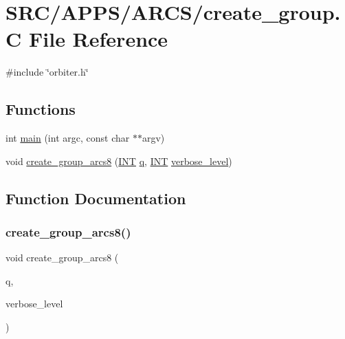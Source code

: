 \hypertarget{create__group_8_c}{}\section{S\+R\+C/\+A\+P\+P\+S/\+A\+R\+C\+S/create\+\_\+group.C File Reference}
\label{create__group_8_c}
{\ttfamily \#include \char`\"{}orbiter.\+h\char`\"{}}\newline
\subsection*{Functions}
\begin{DoxyCompactItemize}
\item 
int \mbox{\hyperlink{create__group_8_c_a217dbf8b442f20279ea00b898af96f52}{main}} (int argc, const char $\ast$$\ast$argv)
\item 
void \mbox{\hyperlink{create__group_8_c_a9928eebe07667a19d9ac9409e0c9702c}{create\+\_\+group\+\_\+arcs8}} (\mbox{\hyperlink{galois_8h_a09fddde158a3a20bd2dcadb609de11dc}{I\+NT}} \mbox{\hyperlink{simeon_8_c_a92cbb483a3b27ae1a0dbfcb125ce216f}{q}}, \mbox{\hyperlink{galois_8h_a09fddde158a3a20bd2dcadb609de11dc}{I\+NT}} \mbox{\hyperlink{simeon_8_c_a818073fbcc2f439e7c56952f67386122}{verbose\+\_\+level}})
\end{DoxyCompactItemize}


\subsection{Function Documentation}
\mbox{\label{create__group_8_c_a9928eebe07667a19d9ac9409e0c9702c}} 
\subsubsection{\texorpdfstring{create\+\_\+group\+\_\+arcs8()}{create\_group\_arcs8()}}
{\footnotesize\ttfamily void create\+\_\+group\+\_\+arcs8 (\begin{DoxyParamCaption}\item[{\mbox{\hyperlink{galois_8h_a09fddde158a3a20bd2dcadb609de11dc}{I\+NT}}}]{q,  }\item[{\mbox{\hyperlink{galois_8h_a09fddde158a3a20bd2dcadb609de11dc}{I\+NT}}}]{verbose\+\_\+level }\end{DoxyParamCaption})}

